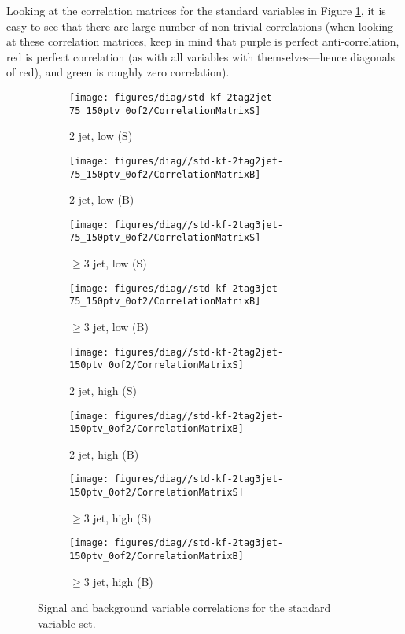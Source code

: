 Looking at the correlation matrices for the standard variables in Figure \ref{fig:std-kf-Correlations}, it is easy to see that there are large number of non-trivial correlations (when looking at these correlation matrices, keep in mind that purple is perfect anti-correlation, red is perfect correlation (as with all variables with themselves---hence diagonals of red), and green is roughly zero correlation).
\begin{figure}[!htbp]\captionsetup{justification=centering}
  \centering
\begin{subfigure}[t]{0.220000\textwidth}\centering\texttt{[image: figures/diag/std-kf-2tag2jet-75\_150ptv\_0of2/CorrelationMatrixS]}\caption{2 jet, low \ptv (S)}\end{subfigure}
\begin{subfigure}[t]{0.220000\textwidth}\centering\texttt{[image: figures/diag//std-kf-2tag2jet-75\_150ptv\_0of2/CorrelationMatrixB]}\caption{2 jet, low \ptv (B)}\end{subfigure}
\begin{subfigure}[t]{0.220000\textwidth}\centering\texttt{[image: figures/diag//std-kf-2tag3jet-75\_150ptv\_0of2/CorrelationMatrixS]}\caption{$\ge3$ jet, low \ptv (S)}\end{subfigure}
\begin{subfigure}[t]{0.220000\textwidth}\centering\texttt{[image: figures/diag//std-kf-2tag3jet-75\_150ptv\_0of2/CorrelationMatrixB]}\caption{$\ge3$ jet, low \ptv (B)}\end{subfigure}
\begin{subfigure}[t]{0.220000\textwidth}\centering\texttt{[image: figures/diag//std-kf-2tag2jet-150ptv\_0of2/CorrelationMatrixS]}\caption{2 jet, high \ptv (S)}\end{subfigure}
\begin{subfigure}[t]{0.220000\textwidth}\centering\texttt{[image: figures/diag//std-kf-2tag2jet-150ptv\_0of2/CorrelationMatrixB]}\caption{2 jet, high \ptv (B)}\end{subfigure}
\begin{subfigure}[t]{0.220000\textwidth}\centering\texttt{[image: figures/diag//std-kf-2tag3jet-150ptv\_0of2/CorrelationMatrixS]}\caption{$\ge3$ jet, high \ptv (S)}\end{subfigure}
\begin{subfigure}[t]{0.220000\textwidth}\centering\texttt{[image: figures/diag//std-kf-2tag3jet-150ptv\_0of2/CorrelationMatrixB]}\caption{$\ge3$ jet, high \ptv (B)}\end{subfigure}
  \caption{Signal and background variable correlations for the standard variable set.}
  \label{fig:std-kf-Correlations}
\end{figure}

